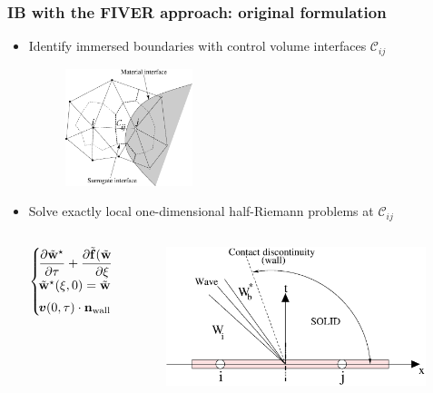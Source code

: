 \begin{frame}
  \frametitle{IB with the FIVER approach: original formulation}
  \vspace{-2mm}
  \begin{itemize}
  \item Identify immersed boundaries with control volume interfaces $\mathcal{C}_{ij}$
    \begin{figure}[t!]
      \centering
      \includegraphics[width=0.35\textwidth]{Fig/fiver1}
    \end{figure} 
    \vspace{-1mm}
  \item Solve exactly local one-dimensional half-Riemann problems at $\mathcal{C}_{ij}$
    \vspace{-2mm}
    \begin{columns}
      \hspace{4mm}
      \begin{column}{0.55\textwidth}
        \begin{equation*}
          \left\{\!\!\!\! \begin{array}{ll}
            \dfrac{\partial \tilde\wbold^\star}{\partial \tau} + \dfrac{\partial\tilde\fbold(\tilde\wbold^\star)}{\partial \xi} = 0 \\[2mm]
            \tilde\wbold^\star(\xi, 0) = \tilde\wbold_{ij}, & \!\!\xi \le 0  \\[2mm]
            \vel(0, \tau)\cdot \nbold_\wall = \vel_\wall\cdot \nbold_\wall, & \!\!0 \le \tau \le \Delta t
          \end{array} \right.
        \end{equation*}
      \end{column}
      \begin{column}{0.43\textwidth}
        \begin{figure}[b!]
          \centering
          \hspace{-5mm}
          \includegraphics[width=0.99\textwidth]{Fig/riemann}

\end{figure}
\end{column}
\end{columns}
\end{itemize}
\end{frame}
